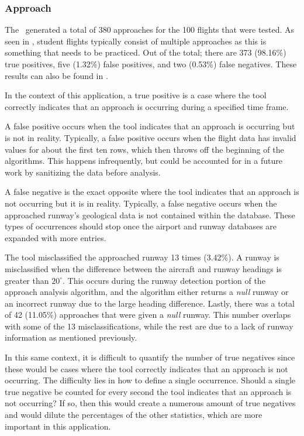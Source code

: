     
    \subsubsection{Approach}
    
        The \toolname\ generated a total of 380 approaches for the 100 flights that were tested. As seen in , student flights typically consist of multiple approaches as this is something that needs to be practiced.  Out of the total; there are 373 (98.16\%) true positives, five (1.32\%) false positives, and two (0.53\%) false negatives.  These results can also be found in .
        
        In the context of this application, a true positive is a case where the tool correctly indicates that an approach is occurring during a specified time frame.
        
        A false positive occurs when the tool indicates that an approach is occurring but is not in reality.  Typically, a false positive occurs when the flight data has invalid values for about the first ten rows, which then throws off the beginning of the algorithms.  This happens infrequently, but could be accounted for in a future work by sanitizing the data before analysis.
        
        A false negative is the exact opposite where the tool indicates that an approach is not occurring but it is in reality.  Typically, a false negative occurs when the approached runway's geological data is not contained within the database.  These types of occurrences should stop once the airport and runway databases are expanded with more entries.
        
        The tool misclassified the approached runway 13 times (3.42\%).  A runway is misclassified when the difference between the aircraft and runway headings is greater than $20^\circ$.  This occurs during the runway detection portion of the approach analysis algorithm, and the algorithm either returns a \emph{null} runway or an incorrect runway due to the large heading difference.  Lastly, there was a total of 42 (11.05\%) approaches that were given a \textit{null} runway.  This number overlaps with some of the 13 misclassifications, while the rest are due to a lack of runway information as mentioned previously.

        In this same context, it is difficult to quantify the number of true negatives since these would be cases where the tool correctly indicates that an approach is not occurring.  The difficulty lies in how to define a single occurrence.  Should a single true negative be counted for every second the tool indicates that an approach is not occurring?  If so, then this would create a numerous amount of true negatives and would dilute the percentages of the other statistics, which are more important in this application.

